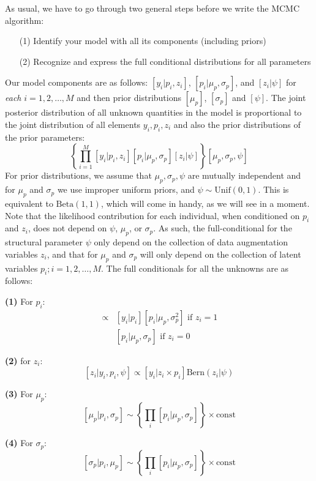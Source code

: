 As usual, we have to go through two general steps before we write the MCMC algorithm:
\begin{itemize}
\item[  (1)] Identify your model with all its components (including
    priors)
\item[  (2)] Recognize and express the full conditional distributions for
    all parameters
\end{itemize}
Our model components are as follows: $[y_{i}| p_{i},z_{i}]$,
$[p_{i}|\mu_{p},\sigma_{p}]$, and $[z_{i}|\psi]$
for {\it each} $i=1,2,\ldots,M$ and then prior distributions
$[\mu_{p}]$, $[\sigma_{p}]$ and $[\psi]$.
The joint posterior distribution of all unknown quantities in the model
is proportional to the joint distribution of all elements
$y_{i},p_{i},z_{i}$ and also the prior distributions of the prior parameters:
\[
\left\{ \prod_{i=1}^{M} [y_{i}|p_{i},z_{i}][p_{i}|\mu_{p},\sigma_{p}]
[z_{i}|\psi] \right\} [\mu_{p},\sigma_{p},\psi]
\]
For prior distributions, we assume that $\mu_{p},\sigma_{p}, \psi$ are
mutually independent and for $\mu_{p}$ and $\sigma_{p}$ we use
improper uniform priors, and $\psi \sim \mbox{Unif}(0,1)$.  This is
equivalent to $\mbox{Beta}(1,1)$, which will come in handy, as we will
see in a moment. Note that the likelihood contribution for each
individual, when conditioned on $p_{i}$ and $z_{i}$, does not depend
on $\psi$, $\mu_{p}$, or $\sigma_{p}$.  As such, the full-conditional
for the structural parameter $\psi$ only depend on the collection of
data augmentation variables $z_{i}$, and that for $\mu_{p}$ and
$\sigma_{p}$ will only depend on the collection of latent variables
$p_{i}; i=1,2,\ldots,M$.  The full conditionals for all the unknowns
are as follows:

{\bf (1)} For $p_{i}$:
\begin{eqnarray*}
[p_{i}|y_{i}, \mu_p, \sigma_{p},z_{i}] &\propto  &
[y_{i}|p_{i}][p_{i}|\mu_p,\sigma_{p}^{2}] \mbox{ if $z_{i}=1$ }  \\
                 &  &  [p_{i}|\mu_p,\sigma_{p}] \mbox{ if $z_{i}=0$ }
\end{eqnarray*}

{\bf (2)} for $z_{i}$:
\[
[z_{i} | y_{i}, p_{i}, \psi] \propto [y_{i}|z_{i} \times p_{i}] \mbox{Bern}(z_{i}|\psi)
\]

{\bf (3)} For $\mu_{p}$:
\[
[\mu_{p} | p_{i}, \sigma_{p}] \sim \left\{ \prod_{i} [p_{i}|\mu_{p}, \sigma_{p}] \right\} \times \mbox{const}
\]

{\bf (4)} For $\sigma_{p}$:
\[
[ \sigma_{p}|p_{i}, \mu_{p} ] \sim \left\{ \prod_{i}[p_{i}| \mu_{p},\sigma_{p} ] \right\} \times \mbox{const}
\]

